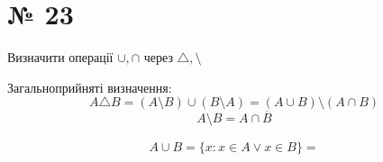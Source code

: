\documentclass[11pt, a4paper]{article} %
\begin{document}
\section*{№ 23}
\begin{mdframed}
    Визначити операції \(\cup, \cap\) через \(\triangle, \setminus\) 
\end{mdframed}

\begin{mdframed}
    Загальноприйняті визначення:
    \[A \triangle B = (A\setminus B) \cup (B \setminus A) = (A \cup B) \setminus (A \cap B) \]
    \[A \setminus B = A \cap \overline B\]
\end{mdframed}

\begin{align*}
    A \cup B = \{x : x \in A \vee x \in B\} =   
\end{align*}
\end{document}
